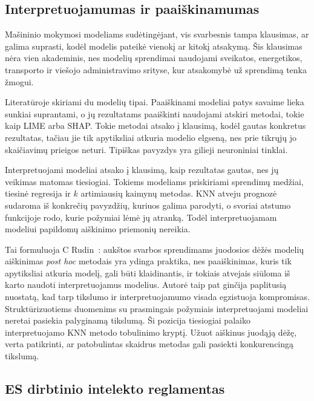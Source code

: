 \documentclass[]{VUMIFTemplateClass}
\begin{document}
    \subsection{Interpretuojamumas ir paaiškinamumas}

    Mašininio mokymosi modeliams sudėtingėjant, vis svarbesnis tampa klausimas, ar galima suprasti, kodėl modelis pateikė vienokį ar kitokį atsakymą.
    Šis klausimas nėra vien akademinis, nes modelių sprendimai naudojami sveikatos, energetikos, transporto ir viešojo administravimo srityse, kur atsakomybė už sprendimą tenka žmogui.

    Literatūroje skiriami du modelių tipai.
    Paaiškinami modeliai patys savaime lieka sunkiai suprantami, o jų rezultatams paaiškinti naudojami atskiri metodai, tokie kaip LIME arba SHAP.
    Tokie metodai atsako į klausimą, kodėl gautas konkretus rezultatas, tačiau jie tik apytiksliai atkuria modelio elgseną, nes prie tikrųjų jo skaičiavimų prieigos neturi.
    Tipiškas pavyzdys yra gilieji neuroniniai tinklai.

    Interpretuojami modeliai atsako į klausimą, kaip rezultatas gautas, nes jų veikimas matomas tiesiogiai.
    Tokiems modeliams priskiriami sprendimų medžiai, tiesinė regresija ir $k$ artimiausių kaimynų metodas.
    KNN atveju prognozė sudaroma iš konkrečių pavyzdžių, kuriuos galima parodyti, o svoriai atstumo funkcijoje rodo, kurie požymiai lėmė jų atranką.
    Todėl interpretuojamam modeliui papildomų aiškinimo priemonių nereikia.

    Tai formuluoja C Rudin~\cite{rudin2019}: aukštos svarbos sprendimams juodosios dėžės modelių aiškinimas \textit{post hoc} metodais yra ydinga praktika, nes paaiškinimas, kuris tik apytiksliai atkuria modelį, gali būti klaidinantis, ir tokiais atvejais siūloma iš karto naudoti interpretuojamus modelius.
    Autorė taip pat ginčija paplitusią nuostatą, kad tarp tikslumo ir interpretuojamumo visada egzistuoja kompromisas.
    Struktūrizuotiems duomenims su prasmingais požymiais interpretuojami modeliai neretai pasiekia palyginamą tikslumą.
    Ši pozicija tiesiogiai palaiko interpretuojamo KNN metodo tobulinimo kryptį.
    Užuot aiškinus juodąją dėžę, verta patikrinti, ar patobulintas skaidrus metodas gali pasiekti konkurencingą tikslumą.


    \subsection{ES dirbtinio intelekto reglamentas}
\end{document}
